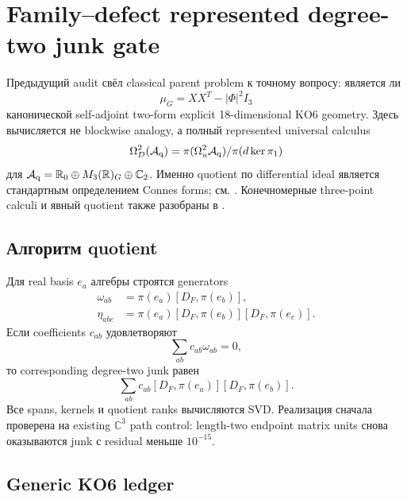 \chapter{Family--defect represented degree-two junk gate}

Предыдущий audit свёл classical parent problem к точному вопросу: является
ли
\begin{equation}
 \mu_G=XX^T-|\Phi|^2I_3
\end{equation}
канонической self-adjoint two-form explicit 18-dimensional KO6 geometry.
Здесь вычисляется не blockwise analogy, а полный represented universal
calculus
\begin{equation}
 \Omega_D^2(\mathcal A_{\rm q})
 =\pi(\Omega_u^2\mathcal A_{\rm q})/\pi(d\ker\pi_1)
\end{equation}
для
\(\mathcal A_{\rm q}=\mathbb R_0\oplus M_3(\mathbb R)_G\oplus\mathbb C_2\).
Именно quotient по differential ideal является стандартным определением
Connes forms; см. . Конечномерные three-point
calculi и явный quotient также разобраны в .

\section{Алгоритм quotient}

Для real basis \(e_a\) алгебры строятся generators
\begin{align}
 \omega_{ab}&=\pi(e_a)[D_F,\pi(e_b)],\\
 \eta_{abc}&=\pi(e_a)[D_F,\pi(e_b)][D_F,\pi(e_c)].
\end{align}
Если coefficients \(c_{ab}\) удовлетворяют
\begin{equation}
 \sum_{ab}c_{ab}\omega_{ab}=0,
\end{equation}
то corresponding degree-two junk равен
\begin{equation}
 \sum_{ab}c_{ab}[D_F,\pi(e_a)][D_F,\pi(e_b)].
\end{equation}
Все spans, kernels и quotient ranks вычисляются SVD. Реализация сначала
проверена на existing \(\mathbb C^3\) path control: length-two endpoint
matrix units снова оказываются junk с residual меньше \(10^{-15}\).

\section{Generic KO6 ledger}

